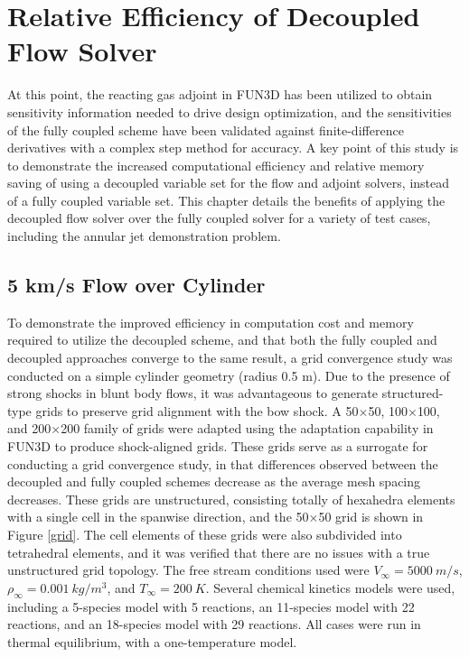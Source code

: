 \chapter{Relative Efficiency of Decoupled Flow Solver}
\label{chapter-eight}

At this point, the reacting gas adjoint in FUN3D has been utilized to obtain
sensitivity information needed to drive design optimization, and the
sensitivities of the fully coupled scheme have been validated against
finite-difference derivatives with a complex step method for accuracy.  A key
point of this study is to demonstrate the increased computational efficiency and
relative memory saving of using a decoupled variable set for the flow and
adjoint solvers, instead of a fully coupled variable set.  This chapter details
the benefits of applying the decoupled flow solver over the fully coupled solver
for a variety of test cases, including the annular jet demonstration problem.

\section{5 km/s Flow over Cylinder}
\label{sec:5-kps-cylinder}

To demonstrate the improved efficiency in computation cost and memory required
to utilize the decoupled scheme, and that both the fully coupled and decoupled
approaches converge to the same result, a grid convergence study was conducted
on a simple cylinder geometry (radius 0.5 m).  Due to the presence of strong
shocks in blunt body flows, it was advantageous to generate structured-type
grids to preserve grid alignment with the bow shock. A 50$\times$50,
100$\times$100, and 200$\times$200 family of grids were adapted using the
adaptation capability in FUN3D\cite{adaptation} to produce shock-aligned grids.
These grids serve as a surrogate for conducting a grid convergence study, in
that differences observed between the decoupled and fully coupled schemes
decrease as the average mesh spacing decreases.  These grids are unstructured,
consisting totally of hexahedra elements with a single cell in the spanwise
direction, and the 50$\times$50 grid is shown in Figure \ref{grid}.  The cell
elements of these grids were also subdivided into tetrahedral elements, and it
was verified that there are no issues with a true unstructured grid topology.
The free stream conditions used were $V_{\infty} = 5000\ m/s$,
$\rho_{\infty}=0.001\ kg/m^3$, and $T_\infty = 200\ K$.  Several chemical
kinetics models were used, including a 5-species model with 5 reactions, an
11-species model with 22 reactions, and an 18-species model with 29 reactions.
All cases were run in thermal equilibrium, with a one-temperature model.

